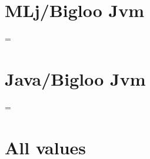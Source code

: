 \documentclass[10pt]{article}
\begin{document}
\section{MLj/Bigloo Jvm}

\begin{center}
\begin{footnotesize}

\end{footnotesize}

\vspace{1cm}

\epsfxsize=\linewidth
{}

\end{center}

\section{Java/Bigloo Jvm}

\begin{center}
\begin{footnotesize}

\end{footnotesize}

\vspace{1cm}

\epsfxsize=\linewidth
{}

\end{center}

\section{All values}

\begin{center}
\begin{footnotesize}

\end{footnotesize}

\end{center}
\end{document}
